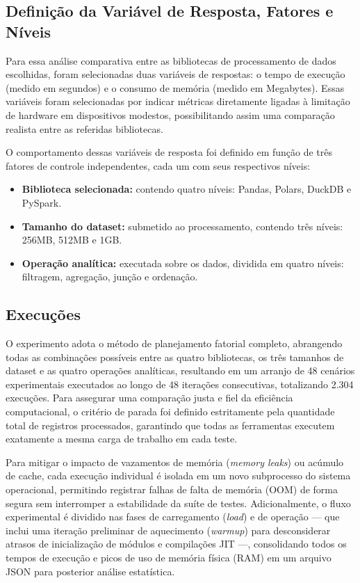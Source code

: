 \documentclass[12pt]{article}
\begin{document}
\subsection{Definição da Variável de Resposta, Fatores e Níveis}

Para essa análise comparativa entre as bibliotecas de processamento de dados escolhidas, foram
selecionadas duas variáveis de respostas: o tempo de execução (medido em segundos) e o consumo de
memória (medido em Megabytes). Essas variáveis foram selecionadas por indicar métricas diretamente
ligadas à limitação de hardware em dispositivos modestos, possibilitando assim uma comparação
realista entre as referidas bibliotecas.

O comportamento dessas variáveis de resposta foi definido em função de três fatores de controle
independentes, cada um com seus respectivos níveis:
\begin{itemize}
    \item \textbf{Biblioteca selecionada:} contendo quatro níveis: Pandas, Polars, DuckDB e PySpark.
    \item \textbf{Tamanho do dataset:} submetido ao processamento, contendo três níveis: 256MB, 512MB e \mbox{1GB}\@.
    \item \textbf{Operação analítica:} executada sobre os dados, dividida em quatro níveis: filtragem, agregação, junção e ordenação.
\end{itemize}
\subsection{Execuções}

O experimento adota o método de planejamento fatorial completo, abrangendo todas as combinações
possíveis entre as quatro bibliotecas, os três tamanhos de dataset e as quatro operações analíticas,
resultando em um arranjo de 48 cenários experimentais executados ao longo de 48 iterações
consecutivas, totalizando 2.304 execuções. Para assegurar uma comparação justa e fiel da eficiência computacional, o critério de
parada foi definido estritamente pela quantidade total de registros processados, garantindo que
todas as ferramentas executem exatamente a mesma carga de trabalho em cada teste.

Para mitigar o impacto de vazamentos de memória (\textit{memory leaks}) ou acúmulo de cache, cada
execução individual é isolada em um novo subprocesso do sistema operacional, permitindo registrar
falhas de falta de memória (OOM) de forma segura sem interromper a estabilidade da suíte de testes.
Adicionalmente, o fluxo experimental é dividido nas fases de carregamento (\textit{load}) e de
operação — que inclui uma iteração preliminar de aquecimento (\textit{warmup}) para desconsiderar
atrasos de inicialização de módulos e compilações JIT —, consolidando todos os tempos de execução e
picos de uso de memória física (RAM) em um arquivo JSON para posterior análise estatística.
\end{document}
